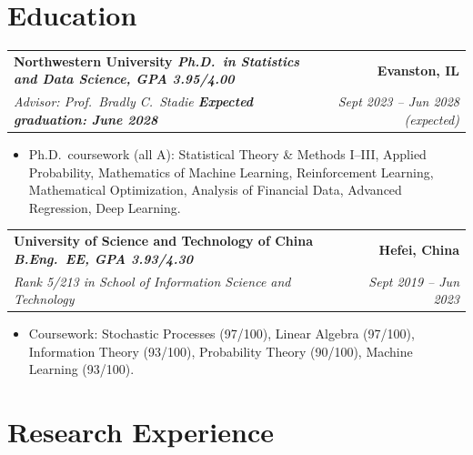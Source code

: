 \documentclass[10.5pt]{article}
\makeatletter
\newcommand{\entry}[4]{%
  \begin{tabularx}{\textwidth}{@{}X@{}r@{}}
    \textbf{#1} & \textbf{#2} \\
    {\itshape\color{metagray}#3} & {\itshape\color{metagray}#4} \\
  \end{tabularx}\vspace{2pt}}
\newenvironment{bullets}
  {\begin{itemize}[leftmargin=1.35em, topsep=2.5pt, itemsep=2pt, parsep=0pt,
                   label=\textcolor{accent}{\footnotesize$\bullet$}]\small}
  {\end{itemize}}
\makeatother
\begin{document}
\section{Education}
\entry{Northwestern University \; {\normalfont\small\itshape\color{metagray}Ph.D.\ in Statistics and Data Science, GPA 3.95/4.00}}
  {Evanston, IL}
  {Advisor: Prof.\ Bradly C.\ Stadie \quad \textbf{Expected graduation: June 2028}}{Sept 2023 -- Jun 2028 (expected)}
\begin{bullets}
  \item Ph.D.\ coursework (all A): Statistical Theory \& Methods I--III, Applied Probability,
        Mathematics of Machine Learning, Reinforcement Learning, Mathematical Optimization,
        Analysis of Financial Data, Advanced Regression, Deep Learning.
\end{bullets}
\vspace{5pt}
\entry{University of Science and Technology of China \; {\normalfont\small\itshape\color{metagray}B.Eng.\ EE, GPA 3.93/4.30}}
  {Hefei, China}
  {Rank 5/213 in School of Information Science and Technology}{Sept 2019 -- Jun 2023}
\begin{bullets}
  \item Coursework: Stochastic Processes (97/100), Linear Algebra (97/100), Information Theory (93/100),
        Probability Theory (90/100), Machine Learning (93/100).
\end{bullets}

\section{Research Experience}
\end{document}
